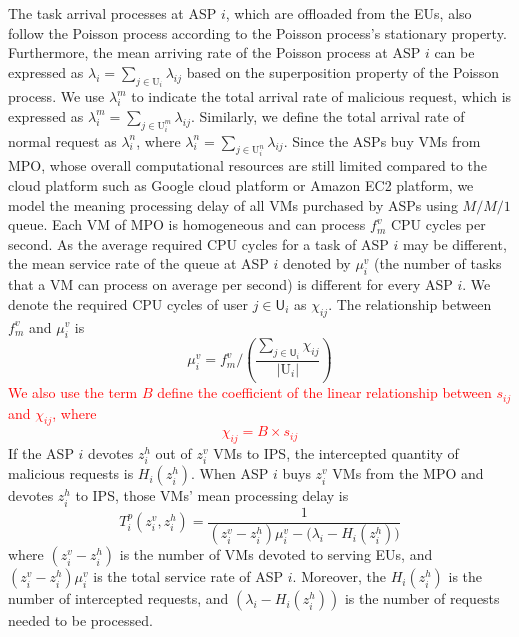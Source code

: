\documentclass[10pt,journal, compsoc]{IEEEtran}
\begin{document}
The task arrival processes at ASP $i$, which are offloaded from the EUs, also follow the Poisson process according to the Poisson process's stationary property. Furthermore, the mean arriving rate of the Poisson process at ASP $i$ can be expressed as $\lambda_i = \sum_{j \in \mathrm{U}_i} \lambda_{ij}$ based on the superposition property of the Poisson process. We use $\lambda_i^m$ to indicate the total arrival rate of malicious request, which is expressed as $\lambda_i^m = \sum_{j \in \mathrm{U}_i^m} \lambda_{ij}$. Similarly, we define the total arrival rate of normal request as $\lambda_i^n$, where $\lambda_i^n =  \sum_{j \in \mathrm{U}_i^n} \lambda_{ij}$. Since the ASPs buy VMs from MPO, whose overall computational resources are still limited compared to the cloud platform such as Google cloud platform or Amazon EC2 platform, we model the meaning processing delay of all VMs purchased by ASPs using $M/M/1$ queue. Each VM of MPO is homogeneous and can process $f_m^v$ CPU cycles per second. As the average required CPU cycles for a task of ASP $i$ may be different, the mean service rate of the queue at ASP $i$ denoted by $\mu_i^v$ (the number of tasks that a VM can process on average per second) is different for every ASP $i$. We denote the required CPU cycles of user $j \in \mathsf{U}_i$ as $\chi_{ij}$. The relationship between $f_m^v$ and $\mu_i^v$ is
\begin{equation}\label{eqn:service_rate}
\mu_i^v = f_m^v/(\frac{\sum_{j \in \mathsf{U}_i} \chi_{ij}}{|\mathrm{U}_i|})
\end{equation}
\textcolor{red}{We also use the term $B$ define the coefficient of the linear relationship between $s_{ij}$ and $\chi_{ij}$, where 
\begin{equation}\label{eqn:required_cpu}
\chi_{ij} = B \times s_{ij}
\end{equation}
}
If the ASP $i$ devotes $z_i^h$ out of $z_i^v$ VMs to IPS, the intercepted quantity of malicious requests is $H_i(z_i^h)$. When ASP $i$ buys $z_i^v$ VMs from the MPO and devotes $z_i^h$ to IPS, those VMs' mean processing delay is
\begin{equation} \label{eqn:asp_mm1_delay}
T_i^p(z_i^v, z_i^h) = \frac{1}{(z_i^v - z_i^h)\mu_i^v - \big(\lambda_i - H_i(z_i^h)\big)}
\end{equation}
where $(z_i^v - z_i^h)$ is the number of VMs devoted to serving EUs, and $(z_i^v - z_i^h)\mu_i^v$ is the total service rate of ASP $i$. Moreover, the $H_i(z_i^h)$ is the number of intercepted requests, and $(\lambda_i - H_i(z_i^h))$ is the number of requests needed to be processed.
\end{document}
